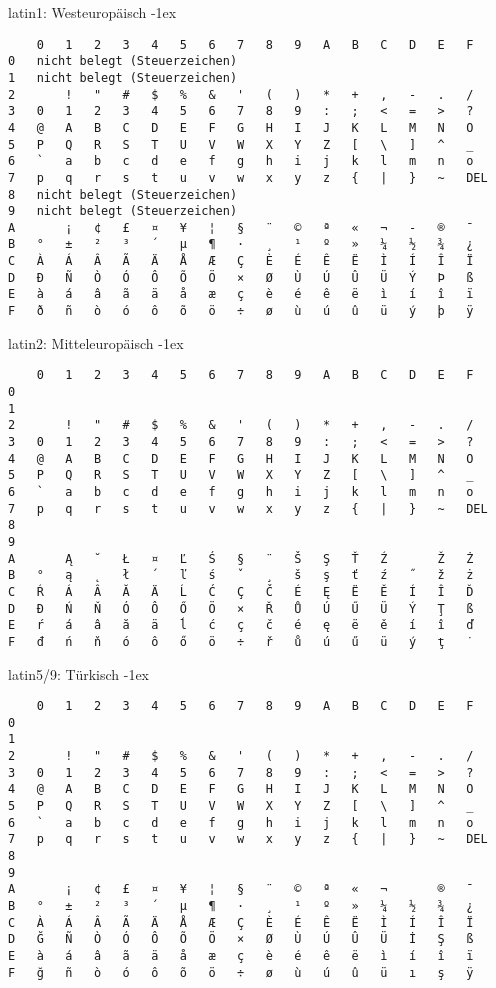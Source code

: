 \begin{frame}[fragile]{latin1: Westeuropäisch}
\kern-1ex\small
\begin{verbatim}
  	0 	1 	2 	3 	4 	5 	6 	7 	8 	9 	A 	B 	C 	D 	E 	F
0 	nicht belegt (Steuerzeichen)
1 	nicht belegt (Steuerzeichen)
2 	  	! 	" 	# 	$ 	% 	& 	' 	( 	) 	* 	+ 	, 	- 	. 	/
3 	0 	1 	2 	3 	4 	5 	6 	7 	8 	9 	: 	; 	< 	= 	> 	?
4 	@ 	A 	B 	C 	D 	E 	F 	G 	H 	I 	J 	K 	L 	M 	N 	O
5 	P 	Q 	R 	S 	T 	U 	V 	W 	X 	Y 	Z 	[ 	\ 	] 	^ 	_
6 	` 	a 	b 	c 	d 	e 	f 	g 	h 	i 	j 	k 	l 	m 	n 	o
7 	p 	q 	r 	s 	t 	u 	v 	w 	x 	y 	z 	{ 	| 	} 	~ 	DEL
8 	nicht belegt (Steuerzeichen)
9 	nicht belegt (Steuerzeichen)
A 	  	¡ 	¢ 	£ 	¤ 	¥ 	¦ 	§ 	¨ 	© 	ª 	« 	¬ 	-  	® 	¯
B 	° 	± 	² 	³ 	´ 	µ 	¶ 	· 	¸ 	¹ 	º 	» 	¼ 	½ 	¾ 	¿
C 	À 	Á 	Â 	Ã 	Ä 	Å 	Æ 	Ç 	È 	É 	Ê 	Ë 	Ì 	Í 	Î 	Ï
D 	Ð 	Ñ 	Ò 	Ó 	Ô 	Õ 	Ö 	× 	Ø 	Ù 	Ú 	Û 	Ü 	Ý 	Þ 	ß
E 	à 	á 	â 	ã 	ä 	å 	æ 	ç 	è 	é 	ê 	ë 	ì 	í 	î 	ï
F 	ð 	ñ 	ò 	ó 	ô 	õ 	ö 	÷ 	ø 	ù 	ú 	û 	ü 	ý 	þ 	ÿ
\end{verbatim}
\end{frame}

\begin{frame}[fragile]{latin2: Mitteleuropäisch}
\kern-1ex\small
\begin{verbatim}
  	0 	1 	2 	3 	4 	5 	6 	7 	8 	9 	A 	B 	C 	D 	E 	F
0
1
2 	  	! 	" 	# 	$ 	% 	& 	' 	( 	) 	* 	+ 	, 	- 	. 	/
3 	0 	1 	2 	3 	4 	5 	6 	7 	8 	9 	: 	; 	< 	= 	> 	?
4 	@ 	A 	B 	C 	D 	E 	F 	G 	H 	I 	J 	K 	L 	M 	N 	O
5 	P 	Q 	R 	S 	T 	U 	V 	W 	X 	Y 	Z 	[ 	\ 	] 	^ 	_
6 	` 	a 	b 	c 	d 	e 	f 	g 	h 	i 	j 	k 	l 	m 	n 	o
7 	p 	q 	r 	s 	t 	u 	v 	w 	x 	y 	z 	{ 	| 	} 	~ 	DEL
8 	
9 	
A 	  	Ą 	˘ 	Ł 	¤ 	Ľ 	Ś 	§ 	¨ 	Š 	Ş 	Ť 	Ź 	  	Ž 	Ż
B 	° 	ą 	˛ 	ł 	´ 	ľ 	ś 	ˇ 	¸ 	š 	ş 	ť 	ź 	˝ 	ž 	ż
C 	Ŕ 	Á 	Â 	Ă 	Ä 	Ĺ 	Ć 	Ç 	Č 	É 	Ę 	Ë 	Ě 	Í 	Î 	Ď
D 	Đ 	Ń 	Ň 	Ó 	Ô 	Ő 	Ö 	× 	Ř 	Ů 	Ú 	Ű 	Ü 	Ý 	Ţ 	ß
E 	ŕ 	á 	â 	ă 	ä 	ĺ 	ć 	ç 	č 	é 	ę 	ë 	ě 	í 	î 	ď
F 	đ 	ń 	ň 	ó 	ô 	ő 	ö 	÷ 	ř 	ů 	ú 	ű 	ü 	ý 	ţ 	˙
\end{verbatim}
\end{frame}
\begin{frame}[fragile]{latin5/9: Türkisch}
\kern-1ex\small
\begin{verbatim}
  	0 	1 	2 	3 	4 	5 	6 	7 	8 	9 	A 	B 	C 	D 	E 	F
0
1
2 	  	! 	" 	# 	$ 	% 	& 	' 	( 	) 	* 	+ 	, 	- 	. 	/
3 	0 	1 	2 	3 	4 	5 	6 	7 	8 	9 	: 	; 	< 	= 	> 	?
4 	@ 	A 	B 	C 	D 	E 	F 	G 	H 	I 	J 	K 	L 	M 	N 	O
5 	P 	Q 	R 	S 	T 	U 	V 	W 	X 	Y 	Z 	[ 	\ 	] 	^ 	_
6 	` 	a 	b 	c 	d 	e 	f 	g 	h 	i 	j 	k 	l 	m 	n 	o
7 	p 	q 	r 	s 	t 	u 	v 	w 	x 	y 	z 	{ 	| 	} 	~ 	DEL
8
9
A 	  	¡ 	¢ 	£ 	¤ 	¥ 	¦ 	§ 	¨ 	© 	ª 	« 	¬ 	  	® 	¯
B 	° 	± 	² 	³ 	´ 	µ 	¶ 	· 	¸ 	¹ 	º 	» 	¼ 	½ 	¾ 	¿
C 	À 	Á 	Â 	Ã 	Ä 	Å 	Æ 	Ç 	È 	É 	Ê 	Ë 	Ì 	Í 	Î 	Ï
D 	Ğ 	Ñ 	Ò 	Ó 	Ô 	Õ 	Ö 	× 	Ø 	Ù 	Ú 	Û 	Ü 	İ 	Ş 	ß
E 	à 	á 	â 	ã 	ä 	å 	æ 	ç 	è 	é 	ê 	ë 	ì 	í 	î 	ï
F 	ğ 	ñ 	ò 	ó 	ô 	õ 	ö 	÷ 	ø 	ù 	ú 	û 	ü 	ı 	ş 	ÿ
\end{verbatim}
\end{frame}


